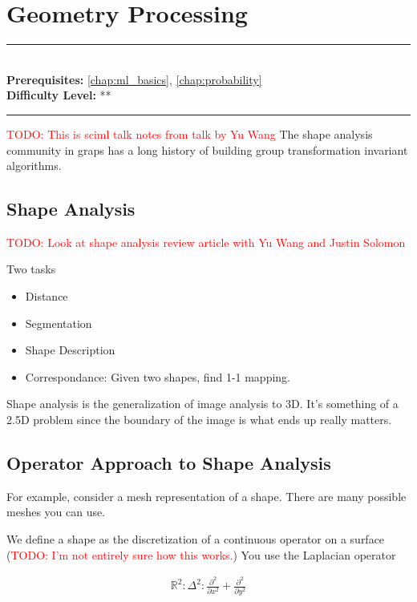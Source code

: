 \documentclass[book.tex]{subfiles}
\begin{document}
\chapter{Geometry Processing}
\label{chap:geometry_processing}
\noindent\rule{11cm}{0.4pt} \\
\textbf{Prerequisites:}  \autoref{chap:ml_basics}, \autoref{chap:probability}  \\
\textbf{Difficulty Level:} ** \\
\noindent\rule{11cm}{0.4pt}
\vspace{5mm}
\textcolor{red}{TODO: This is  sciml talk notes from talk by Yu Wang}
The shape analysis community in graps has a long history of building group transformation invariant algorithms.

\section{Shape Analysis}

\textcolor{red}{TODO: Look at shape analysis review article with Yu Wang and Justin Solomon}

Two tasks
\begin{itemize}
    \item Distance
    \item Segmentation
    \item Shape Description
    \item Correspondance: Given two shapes, find 1-1 mapping.
\end{itemize}

Shape analysis is the generalization of image analysis to 3D. It's something of a 2.5D problem since the boundary of the image is what ends up really matters.


\section{Operator Approach to Shape Analysis}

For example, consider a mesh representation of a shape. There are many possible meshes you can use. 

We define a shape as the discretization of a continuous operator on a surface (\textcolor{red}{TODO: I'm not entirely sure how this works.}) You use the Laplacian operator

\begin{align}
    \mathbb{R}^2: \Delta^2: \frac{\partial^2}{\partial x^2} + \frac{\partial^2}{\partial y^2}
\end{align}
\end{document}
